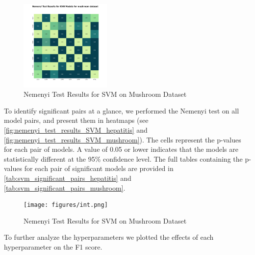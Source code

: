 \begin{figure}
    \centering
    \includegraphics[width=0.4\textwidth]{figures/nemenyi_test_results_SVM_mushroom.png}
    \caption{Nemenyi Test Results for SVM on Mushroom Dataset}
    \label{fig:nemenyi_test_results_SVM_mushroom}
\end{figure}

To identify significant pairs at a glance, we performed the Nemenyi test on all model pairs,
and present them in heatmaps (see \autoref{fig:nemenyi_test_results_SVM_hepatitis} and \autoref{fig:nemenyi_test_results_SVM_mushroom}).
The cells represent the p-values for each pair of models. A value of 0.05 or lower indicates that the models are statistically different
at the 95\% confidence level. The full tables containing the p-values for each pair of significant models are provided in \autoref{tab:svm_significant_pairs_hepatitis} and \autoref{tab:svm_significant_pairs_mushroom}.




\begin{figure}
    \centering
    \texttt{[image: figures/int.png]}
    \caption{Nemenyi Test Results for SVM on Mushroom Dataset}
    \label{fig:nemenyi_test_results_SVM_mushroom}
\end{figure}

To further analyze the hyperparameters we plotted the effects of each hyperparameter on the F1 score.

